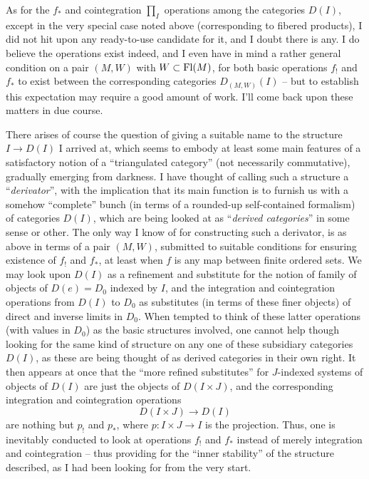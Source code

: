 As for the $f_*$ and cointegration $\prod_I$ operations among the
categories $D(I)$, except in the very special case noted above
(corresponding to fibered products), I did not hit upon any
ready-to-use candidate for it, and I doubt there is any. I do believe
the operations exist indeed, and I even have in mind a
rather general condition on a pair $(M,W)$ with $W\subset\operatorname{Fl}(M)$, for
both basic operations $f_!$ and $f_*$ to exist between the
corresponding categories $D_{(M,W)}(I)$ -- but to establish this
expectation may require a good amount of work. I'll come back upon
these matters in due course.

There arises of course the question of giving a suitable name to the
structure $I\to D(I)$ I arrived at, which seems to embody at least
some main features of a satisfactory notion of a ``triangulated
category'' (not necessarily commutative), gradually emerging from
darkness. I have thought of calling such a structure a
``\emph{derivator}'', with the implication that its main function is
to furnish us with a somehow ``complete'' bunch (in terms of a
rounded-up self-contained formalism) of categories $D(I)$, which are
being looked at as ``\emph{derived categories}'' in some sense or
other. The only way I know of for constructing such a derivator, is as
above in terms of a pair $(M,W)$, submitted to suitable conditions for
ensuring existence of $f_!$ and $f_*$, at least when $f$ is any map
between finite ordered sets. We may look upon $D(I)$ as a refinement
and substitute for the notion of family of objects of $D(e)=D_0$
indexed by $I$, and the integration and cointegration operations from
$D(I)$ to $D_0$ as substitutes (in terms of these finer objects) of
direct and inverse limits in $D_0$. When tempted to think of these
latter operations (with values in $D_0$) as the basic structures
involved, one cannot help though looking for the same kind of
structure on any one of these subsidiary categories $D(I)$, as these
are being thought of as derived categories in their own right. It then
appears at once that the ``more refined substitutes'' for $J$-indexed
systems of objects of $D(I)$ are just the objects of $D(I\times J)$,
and the corresponding integration and cointegration operations
\[ D(I\times J)\to D(I)\]
are nothing but $p_!$ and $p_*$, where $p:I\times J\to I$ is the
projection. Thus, one is inevitably conducted to look at operations
$f_!$ and $f_*$ instead of merely integration and cointegration --
thus providing for the ``inner stability'' of the structure described,
as I had been looking for from the very start.

